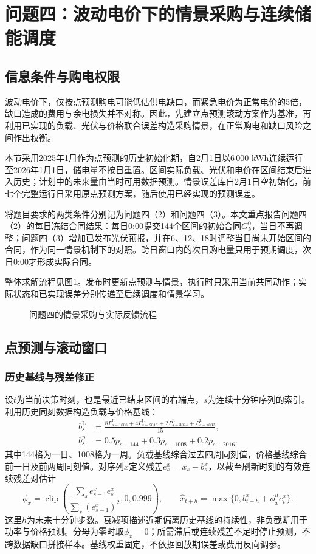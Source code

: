 \section{问题四：波动电价下的情景采购与连续储能调度}
\label{sec:q4}
\subsection{信息条件与购电权限}
波动电价下，仅按点预测购电可能低估供电缺口，而紧急电价为正常电价的5倍，缺口造成的费用与余电损失并不对称。因此，先建立点预测滚动方案作为基准，再利用已实现的负载、光伏与价格联合误差构造采购情景，在正常购电和缺口风险之间作出权衡。

本节采用2025年1月作为点预测的历史初始化期，自2月1日以6\,000 kWh连续运行至2026年1月1日，储电量不按日重置。区间实际负载、光伏和电价在区间结束后进入历史；计划中的未来量由当时可用数据预测。情景误差库自2月1日空初始化，前七个完整运行日采用原点预测方案，随后使用已经实现的预测误差。

将题目要求的两类条件分别记为问题四（2）和问题四（3）。本文重点报告问题四（2）的每日冻结合同结果：每日0:00提交144个区间的初始合同$G_k^0$，当日不再调整；问题四（3）增加已发布光伏预报，并在6、12、18时调整当日尚未开始区间的合同，作为同一情景机制下的对照。跨日窗口内的次日购电量只用于预期调度，次日0:00才形成实际合同。

整体求解流程见图\ref{fig:q4-workflow}。发布时更新点预测与情景，执行时只采用当前共同动作；实际状态和已实现误差分别传递至后续调度和情景学习。
\begin{figure}[H]
\centering
{}
\caption{问题四的情景采购与实际反馈流程}
\label{fig:q4-workflow}
\end{figure}

\subsection{点预测与滚动窗口}
\subsubsection{历史基线与残差修正}
设$t$为当前决策时刻，也是最近已结束区间的右端点，$s$为连续十分钟序列的索引。利用历史同刻数据构造负载与价格基线：
\begin{align}
 b_s^{\mathrm L}&=\frac{8P_{s-1008}^{\mathrm L}+4P_{s-2016}^{\mathrm L}+2P_{s-3024}^{\mathrm L}+P_{s-4032}^{\mathrm L}}{15},\\
 b_s^p&=0.5p_{s-144}+0.3p_{s-1008}+0.2p_{s-2016}.
\end{align}
其中144格为一日、1008格为一周。负载基线综合过去四周同刻值，价格基线综合前一日及前两周同刻值。对序列$x$定义残差$e_s^x=x_s-b_s^x$，以截至刷新时刻的有效连续残差对估计
\begin{equation}
 \phi_x=\operatorname{clip}\!\left(\frac{\sum_s e_{s-1}^xe_s^x}{\sum_s(e_{s-1}^x)^2},0,0.999\right),\qquad
 \widehat x_{t+h}=\max\{0,b_{t+h}^x+\phi_x^he_t^x\}.
\end{equation}
这里$h$为未来十分钟步数。衰减项描述近期偏离历史基线的持续性，非负截断用于功率与价格预测。分母为零时取$\phi_x=0$；所需滞后或连续残差不足时停止预测，不跨数据缺口拼接样本。基线权重固定，不依据回放期误差或费用反向调参。

